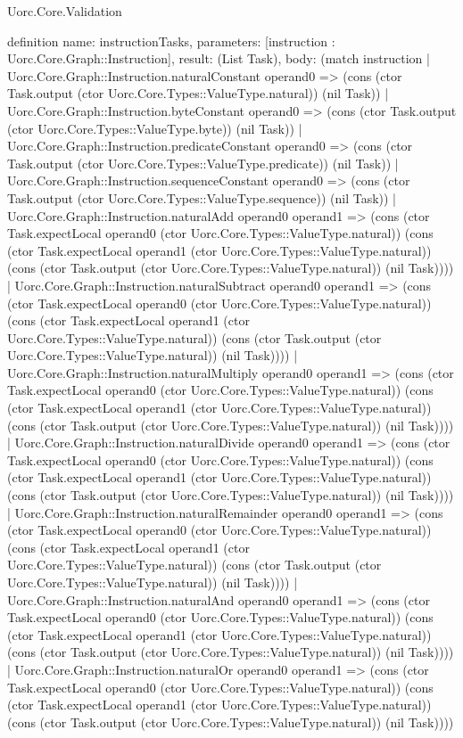 \begin{lexlean}{Uorc.Core.Validation}
\begin{semanticmodule}
definition{
  name: instructionTasks,
  parameters: [instruction : Uorc.Core.Graph::Instruction],
  result: (List Task),
  body: (match instruction
    | Uorc.Core.Graph::Instruction.naturalConstant operand0 => (cons (ctor Task.output (ctor Uorc.Core.Types::ValueType.natural)) (nil Task))
    | Uorc.Core.Graph::Instruction.byteConstant operand0 => (cons (ctor Task.output (ctor Uorc.Core.Types::ValueType.byte)) (nil Task))
    | Uorc.Core.Graph::Instruction.predicateConstant operand0 => (cons (ctor Task.output (ctor Uorc.Core.Types::ValueType.predicate)) (nil Task))
    | Uorc.Core.Graph::Instruction.sequenceConstant operand0 => (cons (ctor Task.output (ctor Uorc.Core.Types::ValueType.sequence)) (nil Task))
    | Uorc.Core.Graph::Instruction.naturalAdd operand0 operand1 => (cons (ctor Task.expectLocal operand0 (ctor Uorc.Core.Types::ValueType.natural)) (cons (ctor Task.expectLocal operand1 (ctor Uorc.Core.Types::ValueType.natural)) (cons (ctor Task.output (ctor Uorc.Core.Types::ValueType.natural)) (nil Task))))
    | Uorc.Core.Graph::Instruction.naturalSubtract operand0 operand1 => (cons (ctor Task.expectLocal operand0 (ctor Uorc.Core.Types::ValueType.natural)) (cons (ctor Task.expectLocal operand1 (ctor Uorc.Core.Types::ValueType.natural)) (cons (ctor Task.output (ctor Uorc.Core.Types::ValueType.natural)) (nil Task))))
    | Uorc.Core.Graph::Instruction.naturalMultiply operand0 operand1 => (cons (ctor Task.expectLocal operand0 (ctor Uorc.Core.Types::ValueType.natural)) (cons (ctor Task.expectLocal operand1 (ctor Uorc.Core.Types::ValueType.natural)) (cons (ctor Task.output (ctor Uorc.Core.Types::ValueType.natural)) (nil Task))))
    | Uorc.Core.Graph::Instruction.naturalDivide operand0 operand1 => (cons (ctor Task.expectLocal operand0 (ctor Uorc.Core.Types::ValueType.natural)) (cons (ctor Task.expectLocal operand1 (ctor Uorc.Core.Types::ValueType.natural)) (cons (ctor Task.output (ctor Uorc.Core.Types::ValueType.natural)) (nil Task))))
    | Uorc.Core.Graph::Instruction.naturalRemainder operand0 operand1 => (cons (ctor Task.expectLocal operand0 (ctor Uorc.Core.Types::ValueType.natural)) (cons (ctor Task.expectLocal operand1 (ctor Uorc.Core.Types::ValueType.natural)) (cons (ctor Task.output (ctor Uorc.Core.Types::ValueType.natural)) (nil Task))))
    | Uorc.Core.Graph::Instruction.naturalAnd operand0 operand1 => (cons (ctor Task.expectLocal operand0 (ctor Uorc.Core.Types::ValueType.natural)) (cons (ctor Task.expectLocal operand1 (ctor Uorc.Core.Types::ValueType.natural)) (cons (ctor Task.output (ctor Uorc.Core.Types::ValueType.natural)) (nil Task))))
    | Uorc.Core.Graph::Instruction.naturalOr operand0 operand1 => (cons (ctor Task.expectLocal operand0 (ctor Uorc.Core.Types::ValueType.natural)) (cons (ctor Task.expectLocal operand1 (ctor Uorc.Core.Types::ValueType.natural)) (cons (ctor Task.output (ctor Uorc.Core.Types::ValueType.natural)) (nil Task))))
}
\end{semanticmodule}
\end{lexlean}
